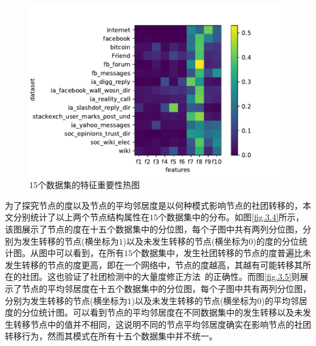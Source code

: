 \begin{figure}[!htbp]
	\setlength{\abovecaptionskip}{0pt} 
	\setlength{\belowcaptionskip}{10pt} 
	\includegraphics[width=.9\textwidth]{./figure/15cmp.pdf}
	\caption{15个数据集的特征重要性热图}
	\label{fig.3.3}
\end{figure}

为了探究节点的度以及节点的平均邻居度是以何种模式影响节点的社团转移的，本文分别统计了以上两个节点结构属性在$15$个数据集中的分布。如图\ref{fig.3.4}所示，该图展示了节点的度在十五个数据集中的分位图，每个子图中共有两列分位图，分别为发生转移的节点(横坐标为$1$)以及未发生转移的节点(横坐标为$0$)的度的分位统计图。从图中可以看到，在所有$15$个数据集中，发生社团转移的节点的度普遍比未发生转移的节点的度更高，即在一个网络中，节点的度越高，其越有可能转移其所在的社团。这也验证了社团检测中的大量度修正方法~\cite{wilson2016modeling,jin2015modeling}的正确性。而图\ref{fig.3.5}则展示了节点的平均邻居度在十五个数据集中的分位图，每个子图中共有两列分位图，分别为发生转移的节点(横坐标为$1$)以及未发生转移的节点(横坐标为$0$)的平均邻居度的分位统计图。可以看到节点的平均邻居度在不同数据集中的发生转移以及未发生转移节点中的值并不相同，这说明不同的节点平均邻居度确实在影响节点的社团转移行为，然而其模式在所有十五个数据集中并不统一。

